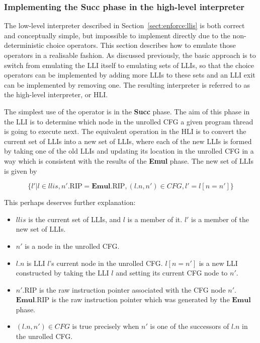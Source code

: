 \subsubsection{Implementing the \textbf{Succ} phase in the high-level interpreter}
\label{sect:enforce:succ}

The low-level interpreter described in Section~\ref{sect:enforce:llis}
is both correct and conceptually simple, but impossible to implement
directly due to the non-deterministic choice operators.  This section
describes how to emulate those operators in a realisable fashion.  As
discussed previously, the basic approach is to switch from emulating
the LLI itself to emulating sets of LLIs, so that the choice operators
can be implemented by adding more LLIs to these sets and an LLI exit
can be implemented by removing one.  The resulting interpreter is
referred to as the high-level interpreter, or HLI.

The simplest use of the operator is in the \textbf{Succ} phase.  The
aim of this phase in the LLI is to determine which node in the
unrolled CFG a given program thread is going to execute next.  The
equivalent operation in the HLI is to convert the current set of LLIs
into a new set of LLIs, where each of the new LLIs is formed by taking
one of the old LLIs and updating its location in the unrolled CFG in a
way which is consistent with the results of the \textbf{Emul} phase.
The new set of LLIs is given by

\begin{displaymath}
\{l' | l \in \mathit{llis}, n'.\mathrm{RIP} = \mathbf{Emul}.\mathrm{RIP}, (l.n, n') \in \mathit{CFG}, l' = l[n = n'] \}
\end{displaymath}

This perhaps deserves further explanation:

\begin{itemize}
\item $\mathit{llis}$ is the current set of LLIs, and $l$ is a member of it.
  $l'$ is a member of the new set of LLIs.
\item $n'$ is a node in the unrolled CFG.
\item $l.n$ is LLI $l$'s current node in the unrolled CFG.  $l[n =
  n']$ is a new LLI constructed by taking the LLI $l$ and setting its
  current CFG node to $n'$.
\item $n'.\mathrm{RIP}$ is the raw instruction pointer associated with
  the CFG node $n'$.  $\mathbf{Emul}.\mathrm{RIP}$ is the raw
  instruction pointer which was generated by the $\mathbf{Emul}$
  phase.
\item $(l.n, n') \in \mathit{CFG}$ is true precisely when $n'$ is one
  of the successors of $l.n$ in the unrolled CFG.
\end{itemize}

